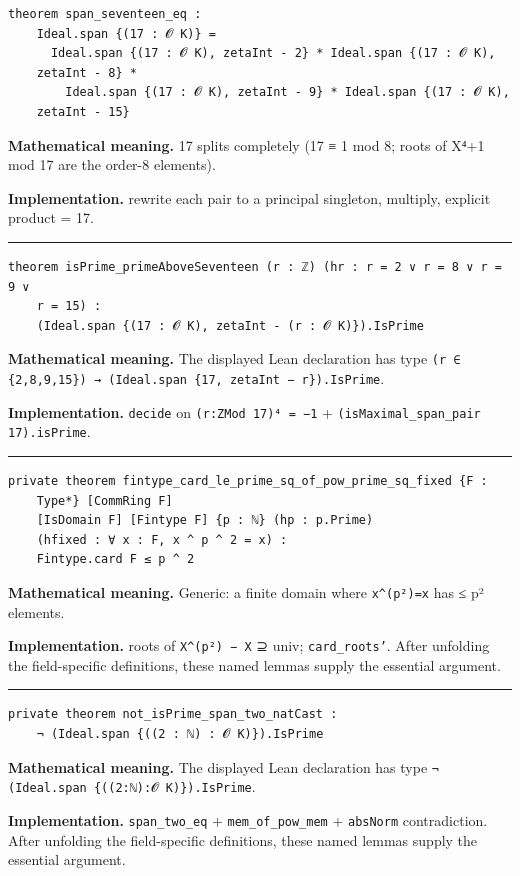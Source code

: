 \documentclass[UTF8,a4paper,11pt,fontset=fandol]{ctexart}
\theoremstyle{definition}
\newcommand{\statementsep}{\par\medskip\hrule\medskip}
\begin{document}
\begin{verbatim}
theorem span_seventeen_eq :
    Ideal.span {(17 : 𝓞 K)} =
      Ideal.span {(17 : 𝓞 K), zetaInt - 2} * Ideal.span {(17 : 𝓞 K),
    zetaInt - 8} *
        Ideal.span {(17 : 𝓞 K), zetaInt - 9} * Ideal.span {(17 : 𝓞 K),
    zetaInt - 15}
\end{verbatim}
\noindent\textbf{Mathematical meaning.} 17 splits completely (17 ≡ 1 mod 8; roots of X⁴+1 mod 17 are the order-8 elements).\par
\noindent\textbf{Implementation.} rewrite each pair to a principal singleton, multiply, explicit product = 17.\par
\statementsep
\begin{verbatim}
theorem isPrime_primeAboveSeventeen (r : ℤ) (hr : r = 2 ∨ r = 8 ∨ r = 9 ∨
    r = 15) :
    (Ideal.span {(17 : 𝓞 K), zetaInt - (r : 𝓞 K)}).IsPrime
\end{verbatim}
\noindent\textbf{Mathematical meaning.} The displayed Lean declaration has type \texttt{(r ∈ \{2,8,9,15\}) → (Ideal.\allowbreak{}span \{17, zetaInt − r\}).\allowbreak{}IsPrime}.\par
\noindent\textbf{Implementation.} \texttt{decide} on \texttt{(r:ZMod 17)⁴ = −1} + \texttt{(isMaximal\_\allowbreak{}span\_\allowbreak{}pair 17).\allowbreak{}isPrime}.\par
\statementsep
\begin{verbatim}
private theorem fintype_card_le_prime_sq_of_pow_prime_sq_fixed {F :
    Type*} [CommRing F]
    [IsDomain F] [Fintype F] {p : ℕ} (hp : p.Prime)
    (hfixed : ∀ x : F, x ^ p ^ 2 = x) :
    Fintype.card F ≤ p ^ 2
\end{verbatim}
\noindent\textbf{Mathematical meaning.} Generic: a finite domain where \texttt{x\textasciicircum{}(p²)=x} has ≤ p² elements.\par
\noindent\textbf{Implementation.} roots of \texttt{X\textasciicircum{}(p²) − X} ⊇ univ; \texttt{card\_\allowbreak{}roots'}. After unfolding the field-specific definitions, these named lemmas supply the essential argument.\par
\statementsep
\begin{verbatim}
private theorem not_isPrime_span_two_natCast :
    ¬ (Ideal.span {((2 : ℕ) : 𝓞 K)}).IsPrime
\end{verbatim}
\noindent\textbf{Mathematical meaning.} The displayed Lean declaration has type \texttt{¬ (Ideal.\allowbreak{}span \{((2:ℕ):𝓞 K)\}).\allowbreak{}IsPrime}.\par
\noindent\textbf{Implementation.} \texttt{span\_\allowbreak{}two\_\allowbreak{}eq} + \texttt{mem\_\allowbreak{}of\_\allowbreak{}pow\_\allowbreak{}mem} + \texttt{absNorm} contradiction. After unfolding the field-specific definitions, these named lemmas supply the essential argument.\par
\end{document}
